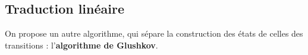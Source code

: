 
\subsection{Traduction linéaire}

On propose un autre algorithme, qui sépare la construction des états de celles des transitions : l'\textbf{algorithme de Glushkov}.

